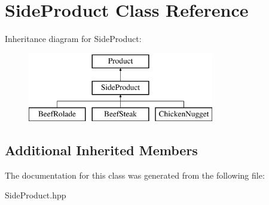 \hypertarget{class_side_product}{}\section{Side\+Product Class Reference}
\label{class_side_product}
Inheritance diagram for Side\+Product\+:\begin{figure}[H]
\begin{center}
\leavevmode
\includegraphics[height=3.000000cm]{class_side_product}
\end{center}
\end{figure}
\subsection*{Additional Inherited Members}


The documentation for this class was generated from the following file\+:\begin{DoxyCompactItemize}
\item 
Side\+Product.\+hpp\end{DoxyCompactItemize}
